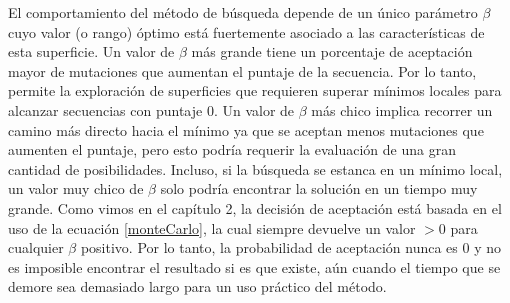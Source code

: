 El comportamiento del método de búsqueda depende de un único parámetro $\beta$ cuyo valor (o rango) óptimo está fuertemente asociado a las características de esta superficie.
Un valor de $\beta$ más grande tiene un porcentaje de aceptación mayor de mutaciones que aumentan el puntaje de la secuencia. Por lo tanto, permite la exploración de superficies que 
requieren superar mínimos locales para alcanzar secuencias con puntaje 0.
Un valor de $\beta$ más chico implica recorrer un camino más directo hacia el mínimo ya que se aceptan menos mutaciones que aumenten el puntaje, pero esto podría requerir la evaluación de una gran cantidad de posibilidades. 
Incluso, si la búsqueda se estanca en un mínimo local, un valor muy chico de $\beta$ solo podría encontrar la solución en un tiempo muy grande. Como vimos en el capítulo 2, la decisión de aceptación está basada en el uso de la ecuación \ref{monteCarlo}, la cual siempre devuelve un valor $>0$ para cualquier $\beta$ positivo.
Por lo tanto, la probabilidad de aceptación nunca es 0 y no es imposible encontrar el resultado si es que existe, aún cuando el tiempo que se demore sea demasiado largo para un uso práctico del método.


